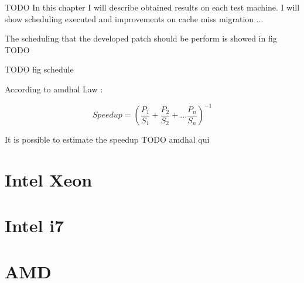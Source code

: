 TODO
In this chapter I will describe obtained results on each test machine. I will show scheduling executed and improvements on cache miss migration  ...

The scheduling that the developed patch should be perform is showed in fig TODO

TODO fig schedule

According to amdhal Law \cite{lcs}:
	
\begin{equation}
       Speedup = (\frac{P_{1}}{S_{1}} + \frac{P_{2}}{S_{2}} + ... \frac{P_{n}}{S_{n}})^{-1} 
\label{eq:amdhal}
\end{equation}

It is possible to estimate the speedup 
TODO amdhal qui

\section{Intel Xeon}



\section{Intel i7}



\section{AMD}

